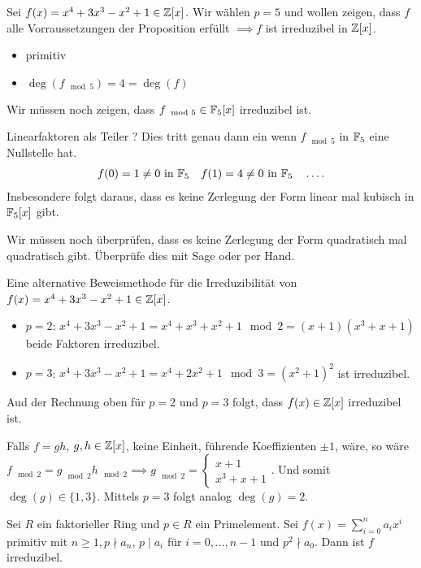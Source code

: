 \begin{eg}
	Sei $f(x) = x^{4} + 3x^3 - x^2 +1 \in \mathbb{Z}[x]$.
	Wir wählen $p = 5$ und wollen zeigen, dass $f$ alle Vorraussetzungen der Proposition erfüllt $\implies f$ ist irreduzibel in $\mathbb{Z}[x]$.
	\begin{itemize}
		\item primitiv \checkmark
		\item $\deg(f_{\mod 5}) = 4 = \deg(f)$ \checkmark
	\end{itemize}
	Wir müssen noch zeigen, dass $f_{\mod 5} \in \mathbb{F}_{5}[x]$ irreduzibel ist.

	Linearfaktoren als Teiler ? Dies tritt genau dann ein wenn $f_{\mod 5}$ in $\mathbb{F}_{5}$ eine Nullstelle hat.
	\begin{align*}
		f(0) = 1 \neq 0 \text{ in } \mathbb{F}_{5} \quad f(1) = 4 \neq 0 \text{ in } \mathbb{F}_{5} \quad \ldots
	.\end{align*}
	Insbesondere folgt daraus, dass es keine Zerlegung der Form linear mal kubisch in $\mathbb{F}_{5}[x]$ gibt.

	Wir müssen noch überprüfen, dass es keine Zerlegung der Form quadratisch mal quadratisch gibt.
	Überprüfe dies mit Sage oder per Hand.

	Eine alternative Beweismethode für die Irreduzibilität von $f(x) = x^{4} + 3 x^3 - x^2 + 1 \in \mathbb{Z}[x]$.
	\begin{itemize}
		\item $p = 2$: $x^{4} + 3x^3 - x^2 + 1 = x^{4} + x^3 + x^2 + 1 \mod 2 = (x+1)(x^3 + x + 1)$ beide Faktoren irreduzibel.
		\item $p=3$: $x^{4} + 3x^3 - x^2 + 1 = x^{4} + 2x^2 + 1 \mod 3 = (x^2 +1)^2$ ist irreduzibel.
	\end{itemize}
	\begin{claim}
		Aud der Rechnung oben für $p=2$ und $p=3$ folgt, dass $f(x) \in \mathbb{Z}[x]$ irreduzibel ist.
	\end{claim}
	Falls $f = gh$, $g,h \in \mathbb{Z}[x]$, keine Einheit, führende Koeffizienten $\pm 1$, wäre, so wäre 
	$f_{\mod 2} = g_{\mod 2} h_{\mod 2} \implies g_{\mod 2} = \begin{cases}
		x+1\\ x^3+x+1
	\end{cases}$. Und somit $\deg(g) \in \{1,3\}$. Mittels $p=3$ folgt analog $\deg(g) = 2$. \contra
\end{eg}

\begin{theorem}
	Sei $R$ ein faktorieller Ring und $p \in R$ ein Primelement.
	Sei $f(x) = \sum_{i=0}^{n} a_{i} x^{i}$  primitiv mit $n \geq 1, p \nmid a_{n}$, $p \mid a_{i}$ für $i = 0,\ldots,n-1$ und $p^2 \nmid a_0$.
	Dann ist $f$ irreduzibel.
\end{theorem}

